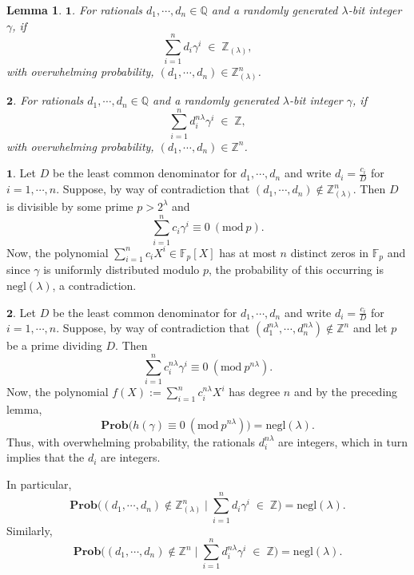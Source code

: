 \documentclass[11pt, lettersize, notitlepage, leqno, footskip=0.6cm]{article}
\newcommand{\bz}{\mathbb Z}
\newcommand{\bq}{\mathbb Q}
\newcommand{\bFp}{\mathbb{F}_p}
\newcommand{\slim}{\sum\limits}
\newcommand{\negl}{\mr{negl}}
\newcommand{\mbf}{\mathbf}
\newcommand{\mr}{\mathrm}
\newcommand{\lam}{\lambda}
\newcommand{\lamb}{\lambda}
\newcommand{\bzlam}{\bz_{(\lam)}}
\newcommand{\Prob}{\mbf{Prob}}
\newcommand{\vs}{\vspace{-0.15cm}}
\newcommand{\noin}{\noindent}
\newcommand{\op}{overwhelming probability}
\newcommand{\Mod}[1]{\ (\mathrm{mod}\ #1)}
\newtheorem{Lem}[Thm]{Lemma}
\numberwithin{equation}{section}
\begin{document}
\begin{Lem}$\mbf{1}$. For rationals $d_1,\cdots, d_n\in \bq$ and a randomly generated $\lam$-bit integer $\gamma$, if \vs$$\sum\limits_{i=1}^n d_i\gamma^i\; \in \;\bzlam,$$ with \op, $(d_1,\cdots, d_n)\in \bzlam^n$.\vspace{0.1cm}

\noin $\mbf{2}$. For rationals $d_1,\cdots, d_n\in \bq$ and a randomly generated $\lam$-bit integer $\gamma$, if \vs $$\slim_{i=1}^n d_i^{n\lam}\gamma^i\; \in \;\bz,$$ with \op, $(d_1,\cdots, d_n)\in \bz^n$.\end{Lem}

\begin{prf} $\mbf{1}$. Let $D$ be the least common denominator for $d_1,\cdots, d_n$ and write $d_i = \frac{c_i}{D}$ for $i=1,\cdots, n.$ Suppose, by way of contradiction that $(d_1,\cdots, d_n )\notin \bzlam^n$. Then $D$ is divisible by some prime $p>2^{\lam}$ and \vs $$\sum\limits_{i=1}^n  {c_i\gamma^i} \equiv 0\Mod{p}.$$ Now, the polynomial $\sum\limits_{i=1}^n c_iX^i \in \bFp[X]$ has at most $n$ distinct zeros in $\bFp$ and since $\gamma$ is uniformly distributed modulo $p$, the probability of this occurring is $\negl(\lamb)$, a contradiction.\vspace{0.15cm} 

\noin $\mbf{2}$. Let $D$ be the least common denominator for $d_1,\cdots, d_n$ and write $d_i = \frac{c_i}{D}$ for $i=1,\cdots, n.$ Suppose, by way of contradiction that $(d_1^{n\lam},\cdots, d_n^{n\lam} )\notin \bz^n$ and let $p$ be a prime dividing $D$. Then $$\slim_{i=1}^n c_i^{n\lam}\gamma^i \equiv 0\Mod{p^{n\lam}}.$$ Now, the polynomial $f(X):= \slim_{i=1}^n c_i^{n\lam} X^i$ has degree $n$ and by the preceding lemma, \vs $$\mbf{Prob}\big(h(\gamma)\equiv 0\Mod{p^{n\lam}} \big) = \negl(\lam).$$ Thus, with \op, the rationals $d_i^{n\lam}$ are integers, which in turn implies that the $d_i$ are integers.\end{prf}


\begin{comment}
For the second part, note that \vs $$\Prob\big(\sum\limits_{i=1}^n d_i\gamma_j^i\in \bz\;\forall j\big|\; (d_1,\cdots,d_n)\notin \bz\big ) = \Prob\big(\sum\limits_{i=1}^n d_i\gamma^i\in \bz\big|\; (d_1,\cdots,d_n)\notin \bz\big )^{\lam} = \negl(\lam).$$\end{comment}

\noindent In particular, \vs $$\mbf{Prob}\big((d_1,\cdots, d_n)\notin \bzlam^n \;\Big|\;\sum\limits_{i=1}^n d_i\gamma^i\; \in \;\bz \big) = \negl(\lamb).$$ Similarly, \vs $$ \mbf{Prob}\big((d_1,\cdots, d_n)\notin \bz^n \;\Big|\;\sum\limits_{i=1}^n d_i^{n\lam}\gamma^i\; \in \;\bz \big) = \negl(\lamb). $$
\end{document}
